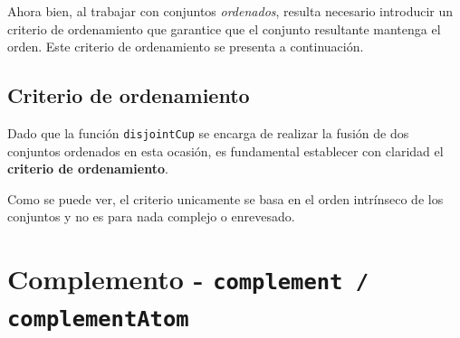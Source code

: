 Ahora bien, al trabajar con conjuntos \textit{ordenados}, resulta necesario introducir un criterio de ordenamiento que garantice que el conjunto resultante mantenga el orden. Este criterio de ordenamiento se presenta a continuación.

\subsection{Criterio de ordenamiento}

Dado que la función \texttt{disjointCup} se encarga de realizar la fusión de dos conjuntos ordenados en esta ocasión, es fundamental establecer con claridad el \textbf{criterio de ordenamiento}.

\begin{center}
\end{center}

Como se puede ver, el criterio unicamente se basa en el orden intrínseco de los conjuntos y no es para nada complejo o enrevesado.

\section{Complemento - \texttt{complement / complementAtom}}

